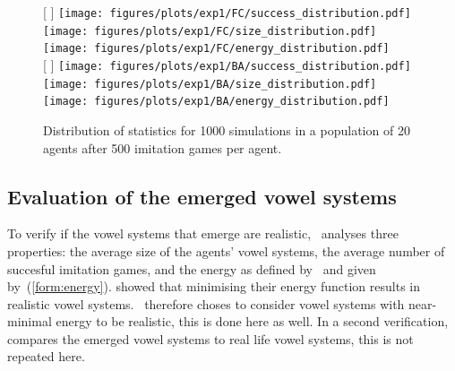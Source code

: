\documentclass[11pt]{article}
\begin{document}
\begin{figure}[t]
    \centering
    [%
        \textwidth %
    ]%
    {%
        \texttt{[image: figures/plots/exp1/FC/success\_distribution.pdf]}
        \hfill
        \texttt{[image: figures/plots/exp1/FC/size\_distribution.pdf]}
        \hfill
        \texttt{[image: figures/plots/exp1/FC/energy\_distribution.pdf]}
    }%
    \\\bigskip
    [%
        \textwidth %
    ]%
    {%
        \texttt{[image: figures/plots/exp1/BA/success\_distribution.pdf]}
        \hfill
        \texttt{[image: figures/plots/exp1/BA/size\_distribution.pdf]}
        \hfill
        \texttt{[image: figures/plots/exp1/BA/energy\_distribution.pdf]}
    }
    \caption{Distribution of statistics for 1000 simulations in a population of 20 agents after 500 imitation games
        per agent.}
    \label{fig:stats}
\end{figure}

\subsection{Evaluation of the emerged vowel systems}
To verify if the vowel systems that emerge are realistic,~ analyses three properties: the average size of the agents'
vowel systems, the average number of succesful imitation games, and the energy as defined by~ and given by~(\ref{form:energy}).
 showed that minimising their energy function results in realistic vowel systems.~
therefore choses to consider vowel systems with near-minimal energy to be realistic, this is done here as well.
In a second verification,~ compares the emerged vowel systems to real life vowel systems, this is not repeated here.
\end{document}
